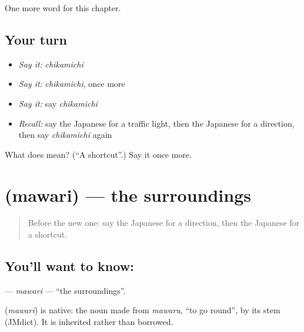 \begin{grammarlens}[title={What you've built}]
One more word for this chapter.
\end{grammarlens}

\subsection*{Your turn}
\begin{itemize}
\raggedright
  \item \emph{Say it:} \emph{chikamichi}
  \item \emph{Say it:} \emph{chikamichi}, once more
  \item \emph{Say it:} say \emph{chikamichi}
  \item \emph{Recall:} say the Japanese for a traffic light, then the Japanese for a direction, then say \emph{chikamichi} again
\end{itemize}

\begin{tcolorbox}[breakable,colback=teal!4,colframe=teal!35!black,title={Before you move on}]
What does  mean? (\textquotedblleft{}A shortcut\textquotedblright{}.) Say it once more.
\end{tcolorbox}
\section[\texorpdfstring{\ja{まわり} (mawari)}{まわり (mawari)}]{ (mawari) — the surroundings}

\label{lesson:JA-C80-mawari}



\begin{quote}
Before the new one: say the Japanese for a direction, then the Japanese for a shortcut.
\end{quote}

\subsection*{You'll want to know: }
\textbf{} — \emph{mawari} — \textquotedblleft{}the surroundings\textquotedblright{}.

\begin{cousinweb}
\textbf{} (\emph{mawari}) is native: the noun made from \emph{mawaru}, \textquotedblleft{}to go round\textquotedblright{}, by its stem (JMdict). It is inherited rather than borrowed.
\end{cousinweb}


